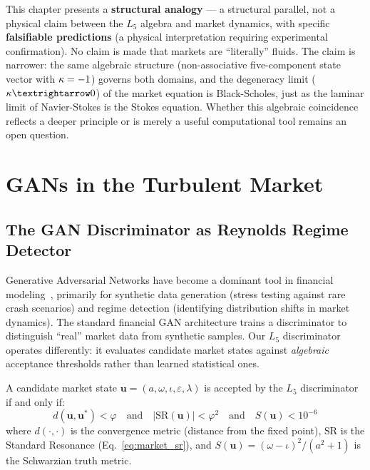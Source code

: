 \begin{remark}
This chapter presents a \textbf{structural analogy} --- a structural parallel, not a physical claim between the $L_5$ algebra and market dynamics, with specific \textbf{falsifiable predictions} (a physical interpretation requiring experimental confirmation). No claim is made that markets are ``literally'' fluids. The claim is narrower: the same algebraic structure (non-associative five-component state vector with $\kappa = -1$) governs both domains, and the degeneracy limit ($\kap \to 0$) of the market equation is Black-Scholes, just as the laminar limit of Navier-Stokes is the Stokes equation. Whether this algebraic coincidence reflects a deeper principle or is merely a useful computational tool remains an open question.
\end{remark}

\section{GANs in the Turbulent Market}

\subsection{The GAN Discriminator as Reynolds Regime Detector}

Generative Adversarial Networks have become a dominant tool in financial modeling~\cite{takahashi2019,eckerli2021}, primarily for synthetic data generation (stress testing against rare crash scenarios) and regime detection (identifying distribution shifts in market dynamics). The standard financial GAN architecture trains a discriminator to distinguish ``real'' market data from synthetic samples. Our $L_5$ discriminator operates differently: it evaluates candidate market states against \emph{algebraic} acceptance thresholds rather than learned statistical ones.

\begin{definition}
A candidate market state $\mathbf{u} = (a, \omega, \iota, \varepsilon, \lambda)$ is accepted by the $L_5$ discriminator if and only if:
\begin{equation}
    d(\mathbf{u}, \mathbf{u}^*) < \varphi \quad\text{and}\quad |\mathrm{SR}(\mathbf{u})| < \varphi^2 \quad\text{and}\quad S(\mathbf{u}) < 10^{-6}
\end{equation}
where $d(\cdot, \cdot)$ is the convergence metric (distance from the fixed point), $\mathrm{SR}$ is the Standard Resonance (Eq.~\ref{eq:market_sr}), and $S(\mathbf{u}) = (\omega - \iota)^2 / (a^2 + 1)$ is the Schwarzian truth metric.
\end{definition}

